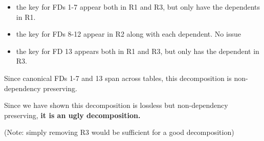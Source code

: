 \documentclass[a4paper]{article}
\begin{document}
\begin{itemize}
    \item the key for FDs 1-7 appear both in R1 and R3, but only have the dependents in R1.
    \item the key for FDs 8-12 appear in R2 along with each dependent. No issue
    \item the key for FD 13 appears both in R1 and R3, but only has the dependent in R3.
\end{itemize}

Since canonical FDs 1-7 and 13 span across tables, this decomposition is non-dependency preserving.

Since we have shown this decomposition is lossless but non-dependency preserving, \textbf{it is an ugly decomposition.}

(Note: simply removing R3 would be sufficient for a good decomposition)
\end{document}
